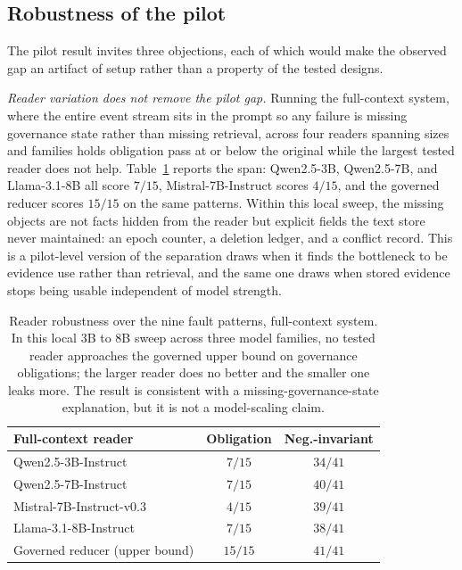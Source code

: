 \subsection{Robustness of the pilot}

The pilot result invites three objections, each of which would make the observed gap an artifact of setup rather than a property of the tested designs.

\emph{Reader variation does not remove the pilot gap.} Running the full-context system, where the entire event stream sits in the prompt so any failure is missing governance state rather than missing retrieval, across four readers spanning sizes and families holds obligation pass at or below the original while the largest tested reader does not help. Table~\ref{tab:aoep-reader} reports the span: Qwen2.5-3B, Qwen2.5-7B, and Llama-3.1-8B all score $7/15$, Mistral-7B-Instruct scores $4/15$, and the governed reducer scores $15/15$ on the same patterns. Within this local sweep, the missing objects are not facts hidden from the reader but explicit fields the text store never maintained: an epoch counter, a deletion ledger, and a conflict record. This is a pilot-level version of the separation \citet{long2026memtrace} draws when it finds the bottleneck to be evidence use rather than retrieval, and the same one \citet{shao2026scaleconditioned} draws when stored evidence stops being usable independent of model strength.

\begin{table}[t]
\centering
\small
\begin{tabular}{lcc}
\toprule
Full-context reader & Obligation & Neg.-invariant \\
\midrule
Qwen2.5-3B-Instruct & $7/15$ & $34/41$ \\
Qwen2.5-7B-Instruct & $7/15$ & $40/41$ \\
Mistral-7B-Instruct-v0.3 & $4/15$ & $39/41$ \\
Llama-3.1-8B-Instruct & $7/15$ & $38/41$ \\
\midrule
Governed reducer (upper bound) & $15/15$ & $41/41$ \\
\bottomrule
\end{tabular}
\caption{Reader robustness over the nine fault patterns, full-context system. In this local $3$B to $8$B sweep across three model families, no tested reader approaches the governed upper bound on governance obligations; the larger reader does no better and the smaller one leaks more. The result is consistent with a missing-governance-state explanation, but it is not a model-scaling claim.}
\label{tab:aoep-reader}
\end{table}

